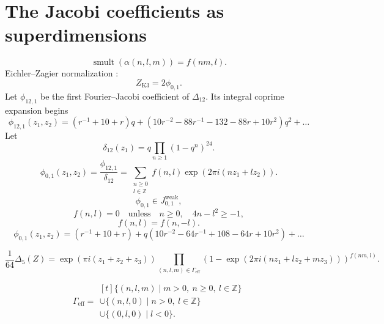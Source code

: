 \documentclass[11pt]{memoir}
\newcommand{\Z}{\mathbb{Z}} \newcommand{\C}{\mathbb{C}}
\newcommand{\smult}{\operatorname{smult}}
\begin{document}
\section{The Jacobi coefficients as superdimensions}

$$\smult(\alpha(n,l,m))=f(nm,l).$$
Eichler--Zagier normalization \cite{EZ:1}:
$$Z_{\mathrm{K3}}=2\phi_{0,1}.$$
Let $\phi_{12,1}$ be the first Fourier--Jacobi coefficient of
$\Delta_{12}$.  Its integral coprime expansion begins
$$\phi_{12,1}(z_1,z_2) = (r^{-1} + 10 + r)q + (10r^{-2} -88r^{-1} -132
-88r +10r^{2})q^2 + \ldots$$
Let
$$\delta_{12}(z_1)=q\prod_{n\geq1}(1-q^n)^{24}.$$
$$\displaystyle\phi_{0,1} (z_1,z_2) =
\frac{\phi_{12,1}}{\delta_{12}} = \displaystyle\sum_{\substack{n\geq 0\\l\in \Z}}
f(n,l)\exp(2\pi i(nz_1 + lz_2)).$$
$$\phi_{0,1}\in J^{\mathrm{weak}}_{0,1},$$
$$f(n,l)=0\quad\text{unless}\quad n\geq0,\quad 4n-l^2\geq-1,$$
$$f(n,l)=f(n,-l).$$
$$\phi_{0,1} (z_1,z_2) = (r^{-1} +10 + r) +
q(10r^{-2} - 64r^{-1} + 108  -64r + 10r^2) + \ldots$$

\begin{theorem}
$$\frac{1}{64} \Delta_5(Z)
= \exp(\pi i(z_1 + z_2 + z_3))
\displaystyle\prod_{(n,l,m)\in\Gamma_{\mathrm{eff}}}
(1 - \exp(2\pi i(nz_1 + lz_2 + mz_3)))^{f(nm,l)}.$$
\end{theorem}

\begin{remark}
$$
\Gamma_{\mathrm{eff}}=
\begin{aligned}[t]
\{(n,l,m)\mid m>0,\ n\geq0,\ l\in\Z\}\\
\cup\{(n,l,0)\mid n>0,\ l\in\Z\}\\
\cup\{(0,l,0)\mid l<0\}.
\end{aligned}
$$
\end{remark}
\end{document}
